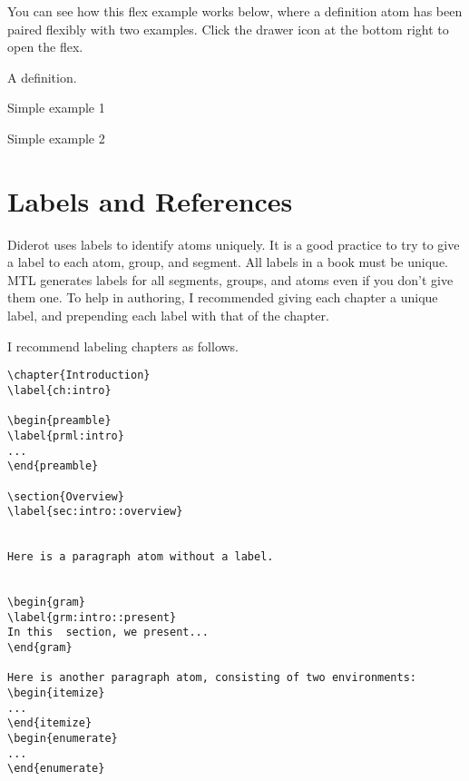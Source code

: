 You can see how this flex example works below, where a definition atom
has been paired flexibly with two examples.  Click the drawer icon
at the bottom right to open the flex.


\begin{flex}
\begin{definition}[A Definition]
\label{def:a}
A definition.
\end{definition}

\begin{example}
\label{ex:simple-1}
Simple example 1
\end{example}

\begin{example}
\label{ex:simple-2}
Simple example 2
\end{example}

\end{flex}
  

\section{Labels and References}

Diderot uses labels to identify atoms uniquely.  It is a good practice
to try to give a label to each atom, group, and segment.  All labels
in a book must be unique.  MTL generates labels for all segments,
groups, and atoms even if you don't give them one.  To help in
authoring, I recommended giving each chapter a unique label, and
prepending each label with that of the chapter.


\begin{example}

I recommend labeling chapters as follows.

\begin{lstlisting}
\chapter{Introduction}
\label{ch:intro}

\begin{preamble}
\label{prml:intro}
...
\end{preamble}

\section{Overview}
\label{sec:intro::overview}


Here is a paragraph atom without a label. 


\begin{gram}
\label{grm:intro::present}
In this  section, we present...
\end{gram}

Here is another paragraph atom, consisting of two environments:
\begin{itemize}
...
\end{itemize}
\begin{enumerate}
...
\end{enumerate}

\end{lstlisting}
\end{example}


